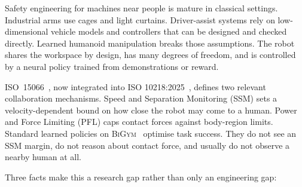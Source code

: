 \documentclass[11pt,a4paper]{report}
\newcommand{\ssm}{SSM}
\newcommand{\pfl}{PFL}
\newcommand{\iso}{ISO~15066}
\newcommand{\bigym}{\textsc{BiGym}}
\begin{document}
Safety engineering for machines near people is mature in classical
settings. Industrial arms use cages and light curtains. Driver-assist
systems rely on low-dimensional vehicle models and controllers that can
be designed and checked directly. Learned humanoid manipulation breaks
those assumptions. The robot shares the workspace by design, has many
degrees of freedom, and is controlled by a neural policy trained from
demonstrations or reward.

\iso{}~\cite{iso15066}, now integrated into ISO
10218:2025~\cite{iso10218,hartmann2026iso}, defines two relevant
collaboration mechanisms. Speed and Separation Monitoring (\ssm{})
sets a velocity-dependent bound on how close the robot may come to a
human. Power and Force Limiting (\pfl{}) caps contact forces against
body-region limits. Standard learned policies on
\bigym{}~\cite{chernyadev2024bigym} optimise task success. They do not
see an \ssm{} margin, do not reason about contact force, and usually
do not observe a nearby human at all.

Three facts make this a research gap rather than only an engineering
gap:
\end{document}

